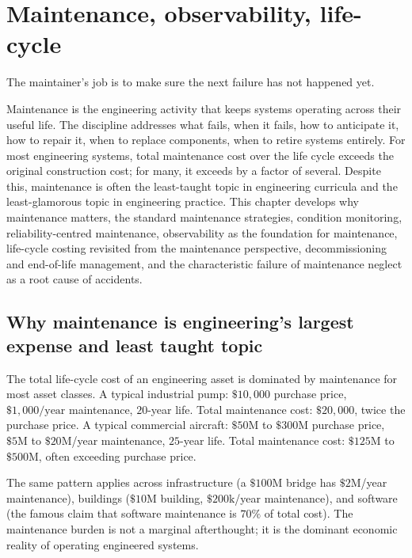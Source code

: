 \chapter{Maintenance, observability, life-cycle}
\label{vol09:ch18}

\epigraph{The maintainer's job is to make sure the next failure has not happened yet.}{}


\noindent
Maintenance is the engineering activity that keeps systems operating across their useful life. The discipline addresses what fails, when it fails, how to anticipate it, how to repair it, when to replace components, when to retire systems entirely. For most engineering systems, total maintenance cost over the life cycle exceeds the original construction cost; for many, it exceeds by a factor of several. Despite this, maintenance is often the least-taught topic in engineering curricula and the least-glamorous topic in engineering practice. This chapter develops why maintenance matters, the standard maintenance strategies, condition monitoring, reliability-centred maintenance, observability as the foundation for maintenance, life-cycle costing revisited from the maintenance perspective, decommissioning and end-of-life management, and the characteristic failure of maintenance neglect as a root cause of accidents.

\section{Why maintenance is engineering's largest expense and least taught topic}

The total life-cycle cost of an engineering asset is dominated by maintenance for most asset classes. A typical industrial pump: $\$10{,}000$ purchase price, $\$1{,}000/\text{year}$ maintenance, $20$-year life. Total maintenance cost: $\$20{,}000$, twice the purchase price. A typical commercial aircraft: $\$50\text{M}$ to $\$300\text{M}$ purchase price, $\$5\text{M}$ to $\$20\text{M}$/year maintenance, $25$-year life. Total maintenance cost: $\$125\text{M}$ to $\$500\text{M}$, often exceeding purchase price.

The same pattern applies across infrastructure (a $\$100\text{M}$ bridge has $\$2\text{M}$/year maintenance), buildings ($\$10\text{M}$ building, $\$200\text{k}$/year maintenance), and software (the famous claim that software maintenance is $70\%$ of total cost). The maintenance burden is not a marginal afterthought; it is the dominant economic reality of operating engineered systems.

